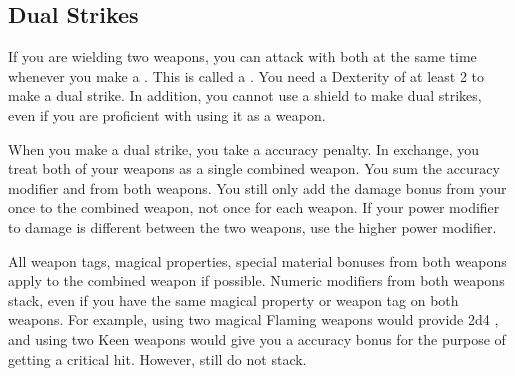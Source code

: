   \subsection{Dual Strikes}\label{Dual Strikes}
    If you are wielding two weapons, you can attack with both at the same time whenever you make a .
    This is called a .
    You need a Dexterity of at least 2 to make a dual strike.
    In addition, you cannot use a shield to make dual strikes, even if you are proficient with using it as a weapon.

    When you make a dual strike, you take a  accuracy penalty.
    In exchange, you treat both of your weapons as a single combined weapon.
    You sum the accuracy modifier and  from both weapons.
    You still only add the damage bonus from your  once to the combined weapon, not once for each weapon.
    If your power modifier to damage is different between the two weapons, use the higher power modifier.

    All weapon tags, magical properties, special material bonuses from both weapons apply to the combined weapon if possible.
    Numeric modifiers from both weapons stack, even if you have the same magical property or weapon tag on both weapons.
    For example, using two magical Flaming weapons would provide 2d4 , and using two Keen weapons would give you a  accuracy bonus for the purpose of getting a critical hit.
    However,  still do not stack.

